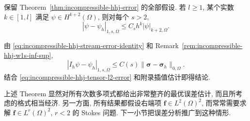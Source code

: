 \begin{Corollary}\label{cor:incompressible-hhj-w1s-error}
保留 Theorem~\ref{thm:incompressible-hhj-error} 的全部假设.
若 $l\geq1$, 某个实数 $k\in[1,l]$ 满足
$\psi\in H^{k+2}(\Omega)$, 则对每个 $s>2$,
\begin{equation}\label{eq:incompressible-hhj-w1s-error}
|\psi-\psi_h|_{1,s,\Omega}
\leq C_sh^k|\psi|_{k+2,\Omega}.
\end{equation}
\end{Corollary}

\begin{Proof}
由 \eqref{eq:incompressible-hhj-stream-error-identity}
和 Remark~\ref{rem:incompressible-hhj-w1s-inf-sup},
\begin{equation}\label{eq:incompressible-hhj-interpolated-w1s-bound}
|I_h\psi-\psi_h|_{1,s,\Omega}
\leq C(s)\|\boldsymbol\sigma-\boldsymbol\sigma_h\|_{0,\Omega}.
\end{equation}
结合 \eqref{eq:incompressible-hhj-tensor-l2-error}
和附录插值估计即得结论.
\end{Proof}

\begin{Remark}\label{rem:incompressible-hhj-optimality}
上述 Theorem 显然对所有次数多项式都给出非常整齐的最优误差估计,
而且所考虑的格式相当经济.
另一方面, 所有结果都假设右端项
$\mathbf f\in L^2(\Omega)^2$,
而常常需要求解 $\mathbf f\in L^r(\Omega)^2$, $r<2$ 的 Stokes 问题.
下一小节把误差分析推广到这种情形.
\end{Remark}

